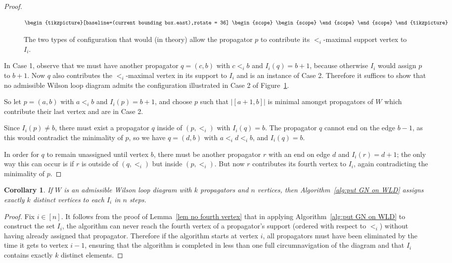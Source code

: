 \documentclass[11pt]{article}
\newtheorem{cor}[thm]{Corollary}
\theoremstyle{remark}
\theoremstyle{definition}
\begin{document}
\begin{proof}
\begin{figure}
\[\begin{tikzpicture}[baseline=(current bounding box.east),rotate = 36]
\begin{scope}
\begin{scope}
	\end{scope}
		\end{scope}
	\end{tikzpicture}
\] 
\caption{The two types of configuration that would (in theory) allow the propagator $p$ to contribute its $<_i$-maximal support vertex to $I_i$.}
\label{fig:no fourth vertex}
\end{figure}
In Case 1, observe that we must have another propagator $q = (c,b)$ with $c<_i b$ and $I_i(q) = b+1$, because otherwise $I_i$ would assign $p$ to $b+1$. Now $q$ also contributes the $<_i$-maximal vertex in its support to $I_i$ and is an instance of Case 2. Therefore it suffices to show that no admissible Wilson loop diagram admits the configuration illustrated in Case 2 of Figure~\ref{fig:no fourth vertex}. 

So let $p = (a,b)$ with $a<_ib$ and $I_i(p) = b+1$, and choose $p$ such that $\big|[a+1,b]\big|$ is minimal amongst propagators of $W$ which contribute their last vertex and are in Case 2.

Since $I_i(p) \neq b$, there must exist a propagator $q$ inside of $(p,<_i)$ with $I_i(q) = b$. The propagator $q$ cannot end on the edge $b-1$, as this would contradict the minimality of $p$, so we have $q = (d,b)$ with $a <_i d <_i b$, and $I_i(q) = b$. 

In order for $q$ to remain unassigned until vertex $b$, there must be another propagator $r$ with an end on edge $d$ and $I_i(r) = d+1$; the only way this can occur is if $r$ is outside of $(q,<_i)$ but inside $(p,<_i)$. But now $r$ contributes its fourth vertex to $I_i$, again contradicting the minimality of $p$.
\end{proof}

\begin{cor}\label{GN alg well defined}
If $W$ is an admissible Wilson loop diagram with $k$ propagators and $n$ vertices, then Algorithm~\ref{alg:put GN on WLD} assigns exactly $k$ distinct vertices to each $I_i$ in $n$ steps.
\end{cor} 
\begin{proof}
Fix $i \in [n]$. It follows from the proof of Lemma~\ref{lem no fourth vertex} that in applying Algorithm~\ref{alg:put GN on WLD} to construct the set $I_i$, the algorithm can never reach the fourth vertex of a propagator's support (ordered with respect to $<_i$) without having already assigned that propagator. Therefore if the algorithm starts at vertex $i$, all propagators must have been eliminated by the time it gets to vertex $i-1$, ensuring that the algorithm is completed in less than one full circumnavigation of the diagram and that $I_i$ contains exactly $k$ distinct elements.
\end{proof}
\end{document}
